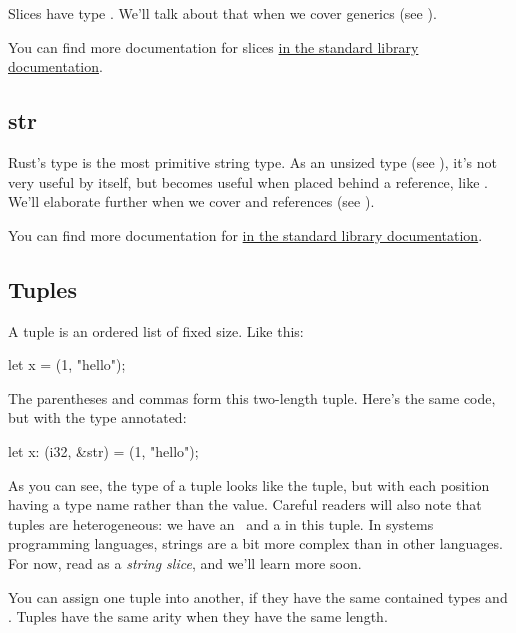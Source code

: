 Slices have type \code{\&[T]}. We'll talk about that  when we cover generics (see ).

\blank

You can find more documentation for slices \href{https://doc.rust-lang.org/std/primitive.slice.html}{in the standard library documentation}.

\subsection*{str}

Rust's  type is the most primitive string type. As an unsized type (see ), it's not very 
useful by itself, but becomes useful when placed behind a reference, like . We'll elaborate further when we cover 
 and references (see ).

\blank

You can find more documentation for  \href{https://doc.rust-lang.org/std/primitive.str.html}{in the standard library
documentation}.

\subsection*{Tuples}

A tuple is an ordered list of fixed size. Like this:

\begin{rustc}
let x = (1, "hello");
\end{rustc}

The parentheses and commas form this two-length tuple. Here's the same code, but with the type annotated:

\begin{rustc}
let x: (i32, &str) = (1, "hello");
\end{rustc}

As you can see, the type of a tuple looks like the tuple, but with each position having a type name rather than the value. Careful 
readers will also note that tuples are heterogeneous: we have an \itt\ and a  in this tuple. In systems programming
languages, strings are a bit more complex than in other languages. For now, read  as a \emph{string slice}, and we'll 
learn more soon.

\blank

You can assign one tuple into another, if they have the same contained types and . Tuples have the same arity 
when they have the same length.

